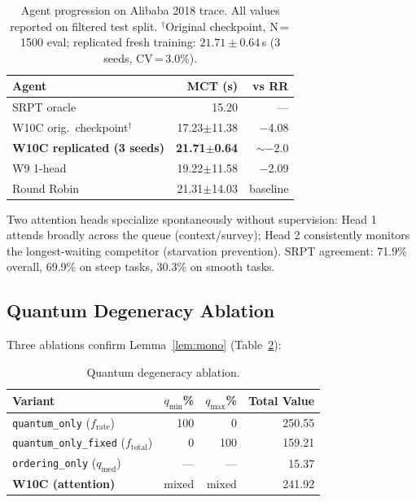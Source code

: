 \documentclass[10pt,twocolumn]{article}
\theoremstyle{remark}
\begin{document}
\begin{table}[h]
\centering
\caption{Agent progression on Alibaba 2018 trace. All values
reported on filtered test split. $^\dagger$Original checkpoint,
N\,=\,1500 eval; replicated fresh training: $21.71\pm0.64$\,s
(3 seeds, CV\,=\,3.0\%).}
\label{tab:w10c}
\small
\begin{tabular}{lrr}
\toprule
Agent & MCT (s) & vs RR \\
\midrule
SRPT oracle & 15.20 & --- \\
W10C orig.\ checkpoint$^\dagger$ & 17.23$\pm$11.38 & $-$4.08 \\
\textbf{W10C replicated (3 seeds)} & \textbf{21.71$\pm$0.64} & $\sim$$-$2.0 \\
W9 1-head & 19.22$\pm$11.58 & $-$2.09 \\
Round Robin & 21.31$\pm$14.03 & baseline \\
\bottomrule
\end{tabular}
\end{table}

Two attention heads specialize spontaneously without supervision:
Head 1 attends broadly across the queue (context/survey); Head 2
consistently monitors the longest-waiting competitor (starvation
prevention). SRPT agreement: 71.9\% overall, 69.9\% on steep tasks,
30.3\% on smooth tasks.

\subsection{Quantum Degeneracy Ablation}
\label{sec:theory-confirms}

Three ablations confirm Lemma~\ref{lem:mono} (Table~\ref{tab:abl}):

\begin{table}[h]
\centering
\caption{Quantum degeneracy ablation.}
\label{tab:abl}
\small
\begin{tabular}{lrrr}
\toprule
Variant & $q_{\min}$\% & $q_{\max}$\% & Total Value \\
\midrule
\texttt{quantum\_only} ($f_{\mathrm{rate}}$) & 100 & 0 & 250.55 \\
\texttt{quantum\_only\_fixed} ($f_{\mathrm{total}}$) & 0 & 100 & 159.21 \\
\texttt{ordering\_only} ($q_{\mathrm{med}}$) & --- & --- & 15.37 \\
\textbf{W10C (attention)} & mixed & mixed & 241.92 \\
\bottomrule
\end{tabular}
\end{table}
\end{document}
